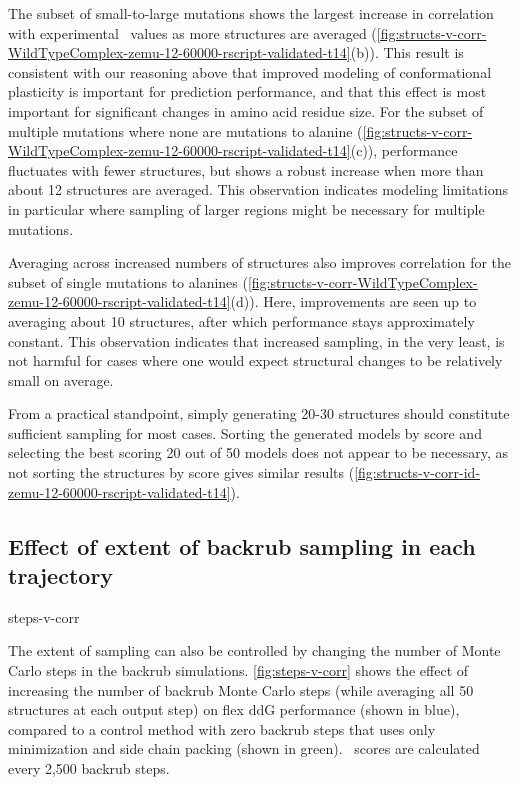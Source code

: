 The subset of small-to-large mutations shows the largest increase in correlation with experimental \ddg\ values as more structures are averaged (\cref{fig:structs-v-corr-WildTypeComplex-zemu-12-60000-rscript-validated-t14}(b)). This result is consistent with our reasoning above that improved modeling of conformational plasticity is important for prediction performance, and that this effect is most important for significant changes in amino acid residue size. For the subset of multiple mutations where none are mutations to alanine (\cref{fig:structs-v-corr-WildTypeComplex-zemu-12-60000-rscript-validated-t14}(c)), performance fluctuates with fewer structures, but shows a robust increase when more than about 12 structures are averaged. This observation indicates modeling limitations in particular where sampling of larger regions might be necessary for multiple mutations.

Averaging across increased numbers of structures also improves correlation for the subset of single mutations to alanines (\cref{fig:structs-v-corr-WildTypeComplex-zemu-12-60000-rscript-validated-t14}(d)).
Here, improvements are seen up to averaging about 10 structures, after which performance stays approximately constant.
This observation indicates that increased sampling, in the very least, is not harmful for cases where one would expect structural changes to be relatively small on average.

From a practical standpoint, simply generating 20-30 structures should constitute sufficient sampling for most cases. Sorting the generated models by score and selecting the best scoring 20 out of 50 models does not appear to be necessary, as not sorting the structures by score gives similar results (\cref{fig:structs-v-corr-id-zemu-12-60000-rscript-validated-t14}).

\subsection{Effect of extent of backrub sampling in each trajectory}

{steps-v-corr}

The extent of sampling can also be controlled by changing the number of Monte Carlo steps in the backrub simulations.
\cref{fig:steps-v-corr} shows the effect of increasing the number of backrub Monte Carlo steps (while averaging all 50 structures at each output step) on flex ddG performance (shown in blue), compared to a control method with zero backrub steps that uses only minimization and side chain packing (shown in green).
\ddg\ scores are calculated every 2,500 backrub steps.

